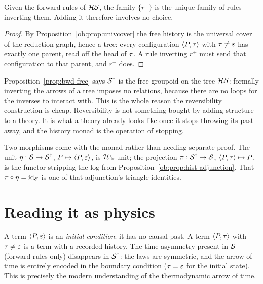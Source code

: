 \begin{proposition}
\label{prop:bwd-free}
Given the forward rules of $\mathcal{H}\mathcal{S}$, the family $\{r^-\}$ is the unique
family of rules inverting them.  Adding it therefore involves no choice.
\end{proposition}

\begin{proof}
By Proposition~\ref{ob:prop:univcover} the free history is the universal cover
of the reduction graph, hence a tree: every configuration
$\langle P, \tau \rangle$ with $\tau \neq \varepsilon$ has exactly one parent, read
off the head of $\tau$.  A rule inverting $r^+$ must send that configuration
to that parent, and $r^-$ does.
\end{proof}

\begin{remark}
\label{rmk:free-groupoid}
Proposition~\ref{prop:bwd-free} says $\mathcal{S}^\dagger$ is the free groupoid on
the tree $\mathcal{H}\mathcal{S}$: formally inverting the arrows of a tree imposes no
relations, because there are no loops for the inverses to interact with.
This is the whole reason the reversibility construction is cheap.
Reversibility is not something bought by adding structure to a theory.  It is
what a theory already looks like once it stops throwing its past away, and the
history monad is the operation of stopping.
\end{remark}

Two morphisms come with the monad rather than needing separate proof.  The unit
$\eta : \mathcal{S} \to \mathcal{S}^\dagger$, $P \mapsto \langle P, \varepsilon \rangle$, is
$\mathcal{H}$'s unit; the projection $\pi : \mathcal{S}^\dagger \to \mathcal{S}$,
$\langle P, \tau \rangle \mapsto P$, is the functor stripping the log from
Proposition~\ref{ob:prop:hist-adjunction}.  That
$\pi \circ \eta = \mathrm{id}_{\mathcal{S}}$ is one of that adjunction's triangle
identities.

\section{Reading it as physics}

\begin{remark}
A term $\langle P, \varepsilon \rangle$ is an \emph{initial condition}: it has no causal
past.  A term $\langle P, \tau \rangle$ with $\tau \neq \varepsilon$ is a term with a
recorded history.  The time-asymmetry present in $\mathcal{S}$ (forward rules only)
disappears in $\mathcal{S}^\dagger$: the laws are symmetric, and the arrow of time is
entirely encoded in the boundary condition ($\tau = \varepsilon$ for the initial
state).  This is precisely the modern understanding of the thermodynamic arrow
of time.
\end{remark}

